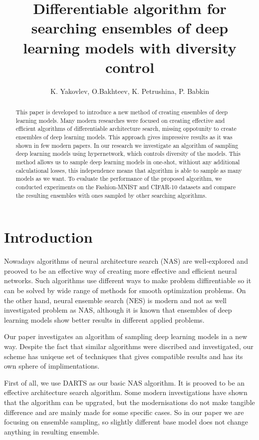 \documentclass{article}
\title{Differentiable algorithm for searching ensembles of deep learning models with diversity control}
\author{K. Yakovlev, O.Bakhteev, K. Petrushina, P. Babkin
}
\date{}
\begin{document}
\maketitle

\begin{abstract}
	
This paper is developed to introduce a new method of creating ensembles of deep learning models. 
Many modern researches were focused on creating effective and efficient algorithms of differentiable architecture search,
missing oppotunity to create ensembles of deep learning models. This approach gives impressive results
as it was shown in few modern papers. In our research we investigate an algorithm of sampling deep learning models using
hypernetwork, which controls diversity of the models. This method allows us to sample deep learning models in one-shot,
withiout any additional calculational losses, this independence means that algorithm is able to sample as many models
as we want. To evaluate the performance of the proposed algorithm, we conducted experiments on the Fashion-MNIST and CIFAR-10
datasets and compare the resulting ensembles with ones sampled by other searching algorithms.

\end{abstract}



\section{Introduction}

Nowadays algorithms of neural architecture search (NAS) are well-explored and prooved to be an effective way of creating
more effective and efficient neural networks. Such algorithms use different ways to make problem diffirentiable so it can
be solved by wide range of methods for smooth optimization problems. On the other hand, neural ensemble search (NES) is
modern and not as well investigated problem as NAS, although it is known that ensembles of deep learning models show better
results in different applied problems.

Our paper investigates an algorithm of sampling deep learning models in a new way. Despite the fact that similar algorithms
were discribed and investigated, our scheme has uniqeue set of techniques that gives compatible results and has its own sphere
of implimentations.

First of all, we use DARTS as our basic NAS algorithm. It is prooved to be an effective architecture search algorithm. Some
modern investigations have shown that the algorithm can be upgrated, but the modernisations do not make tangible difference
and are mainly made for some specific cases. So in our paper we are focusing on ensemble sampling, so slightly different base
model does not change anything in resulting ensemble.
\end{document}
